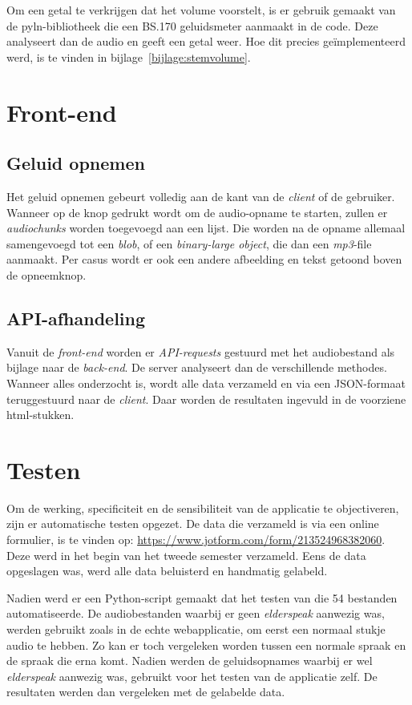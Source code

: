 Om een getal te verkrijgen dat het volume voorstelt, is er gebruik gemaakt van de pyln-bibliotheek die een BS.170 geluidsmeter aanmaakt in de code. Deze analyseert dan de audio en geeft een getal weer. Hoe dit precies geïmplementeerd werd, is te vinden in bijlage~\ref{bijlage:stemvolume}.

\section{Front-end}
\subsection{Geluid opnemen}
Het geluid opnemen gebeurt volledig aan de kant van de \textit{client} of de gebruiker. Wanneer op de knop gedrukt wordt om de audio-opname te starten, zullen er \textit{audiochunks } worden toegevoegd aan een lijst. Die worden na de opname allemaal samengevoegd tot een \textit{blob}, of een \textit{binary-large object}, die dan een \textit{mp3}-file aanmaakt.
Per casus wordt er ook een andere afbeelding en tekst getoond boven de opneemknop.

\subsection{API-afhandeling}
Vanuit de \textit{front-end} worden er \textit{API-requests} gestuurd met het audiobestand als bijlage naar de \textit{back-end}. De server analyseert dan de verschillende methodes. Wanneer alles onderzocht is, wordt alle data verzameld en via een JSON-formaat teruggestuurd naar de \textit{client}. Daar worden de resultaten ingevuld in de voorziene html-stukken.

\section{Testen}
Om de werking, specificiteit en de sensibiliteit van de applicatie te objectiveren, zijn er automatische testen opgezet. De data die verzameld is via een online formulier, is te vinden op:  \url{https://www.jotform.com/form/213524968382060}. Deze werd in het begin van het tweede semester verzameld. Eens de data opgeslagen was, werd alle data beluisterd en handmatig gelabeld.

Nadien werd er een Python-script gemaakt dat het testen van die 54 bestanden automatiseerde. De audiobestanden waarbij er geen \textit{elderspeak} aanwezig was, werden gebruikt zoals in de echte webapplicatie, om eerst een normaal stukje audio te hebben. Zo kan er toch vergeleken worden tussen een normale spraak en de spraak die erna komt. Nadien werden de geluidsopnames waarbij er wel \textit{elderspeak} aanwezig was, gebruikt voor het testen van de applicatie zelf. De resultaten werden dan vergeleken met de gelabelde data.

